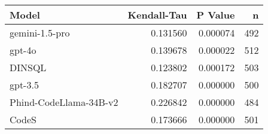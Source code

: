 \begin{tabular}{lrrr}
\toprule
Model & Kendall-Tau & P Value & n \\
\midrule
gemini-1.5-pro & 0.131560 & 0.000074 & 492 \\
gpt-4o & 0.139678 & 0.000022 & 512 \\
DINSQL & 0.123802 & 0.000172 & 503 \\
gpt-3.5 & 0.182707 & 0.000000 & 500 \\
Phind-CodeLlama-34B-v2 & 0.226842 & 0.000000 & 484 \\
CodeS & 0.173666 & 0.000000 & 501 \\
\bottomrule
\end{tabular}
